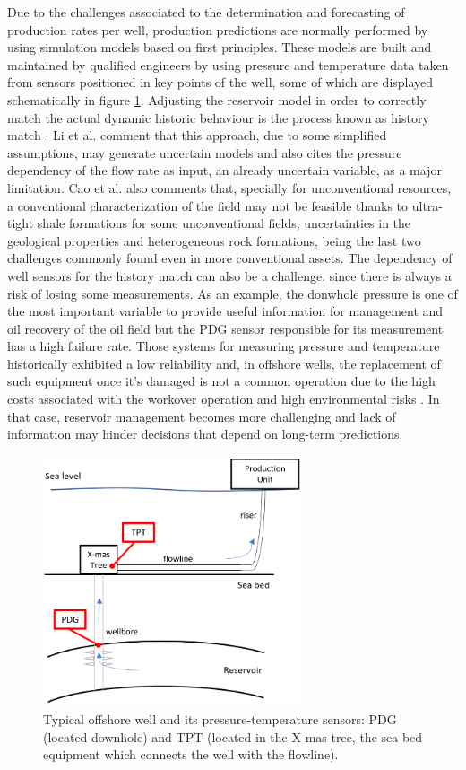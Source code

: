 \documentclass[conference]{IEEEtran}
\begin{document}
Due to the challenges associated to the determination and forecasting of production rates per well, production predictions are normally performed by using simulation models based on first principles. These models are built and maintained by qualified engineers by using pressure and temperature data taken from sensors positioned in key points of the well, some of which are displayed schematically in figure \ref{fig:pressureSensors}. Adjusting the reservoir model in order to correctly match the actual dynamic historic behaviour is the process known as history match \cite{alakeely2022simulating}. Li et al. \cite{Li2019} comment that this approach, due to some simplified assumptions, may generate uncertain models and also cites the pressure dependency of the flow rate as input, an already uncertain variable, as a major limitation. Cao et al. \cite{CaoQ2016} also comments that, specially for unconventional resources, a conventional characterization of the field may not be feasible thanks to ultra-tight shale formations for some unconventional fields, uncertainties in the geological properties and heterogeneous rock formations, being the last two challenges commonly found even in more conventional assets. The dependency of well sensors for the history match can also be a challenge, since there is always a risk of losing some measurements. As an example, the donwhole pressure is one of the most important variable to provide useful information for management and oil recovery of the oil field \cite{camponogara2010automation} but the PDG sensor responsible for its measurement has a high failure rate. Those systems for measuring pressure and temperature historically exhibited a low reliability \cite{Gisbergen2001} and, in offshore wells, the replacement of such equipment once it's damaged is not a common operation due to the high costs associated with the workover operation and high environmental risks \cite{Freitas2021}. In that case, reservoir management becomes more challenging and lack of information may hinder decisions that depend on long-term predictions. 

\begin{figure}[htbp]
\centerline{\includegraphics[width=3.0in]{wellScheme.png}}
\caption{Typical offshore well and its pressure-temperature sensors: PDG (located downhole) and TPT (located in the X-mas tree, the sea bed equipment which connects the well with the flowline).}
\label{fig:pressureSensors}
\end{figure}
\end{document}

